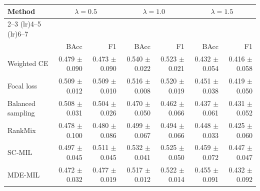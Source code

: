 \begin{tabular}{lrrrrrr}
\toprule
Method & \multicolumn{2}{c}{$\lambda=0.5$} & \multicolumn{2}{c}{$\lambda=1.0$} & \multicolumn{2}{c}{$\lambda=1.5$} \\ \cmidrule(lr){2--3} \cmidrule(lr){4--5} \cmidrule(lr){6--7}\\
 & BAcc & F1 & BAcc & F1 & BAcc & F1\\
\midrule
Weighted CE & \num{0.479} $\pm$ \num{0.090} & \num{0.473} $\pm$ \num{0.090} & \num{0.540} $\pm$ \num{0.022} & \num{0.523} $\pm$ \num{0.021} & \num{0.432} $\pm$ \num{0.054} & \num{0.416} $\pm$ \num{0.058}\\
Focal loss & \num{0.509} $\pm$ \num{0.012} & \num{0.509} $\pm$ \num{0.010} & \num{0.516} $\pm$ \num{0.008} & \num{0.520} $\pm$ \num{0.019} & \num{0.451} $\pm$ \num{0.038} & \num{0.419} $\pm$ \num{0.050}\\
Balanced sampling & \num{0.508} $\pm$ \num{0.031} & \num{0.504} $\pm$ \num{0.026} & \num{0.470} $\pm$ \num{0.050} & \num{0.462} $\pm$ \num{0.066} & \num{0.437} $\pm$ \num{0.061} & \num{0.431} $\pm$ \num{0.052}\\
RankMix & \num{0.478} $\pm$ \num{0.100} & \num{0.480} $\pm$ \num{0.086} & \num{0.499} $\pm$ \num{0.067} & \num{0.494} $\pm$ \num{0.066} & \num{0.448} $\pm$ \num{0.033} & \num{0.425} $\pm$ \num{0.060}\\
SC-MIL & \num{0.497} $\pm$ \num{0.045} & \num{0.511} $\pm$ \num{0.045} & \num{0.532} $\pm$ \num{0.041} & \num{0.525} $\pm$ \num{0.050} & \num{0.459} $\pm$ \num{0.072} & \num{0.447} $\pm$ \num{0.047}\\
MDE-MIL & \num{0.472} $\pm$ \num{0.032} & \num{0.477} $\pm$ \num{0.019} & \num{0.517} $\pm$ \num{0.012} & \num{0.522} $\pm$ \num{0.014} & \num{0.455} $\pm$ \num{0.091} & \num{0.432} $\pm$ \num{0.092}\\
\bottomrule
\end{tabular}

